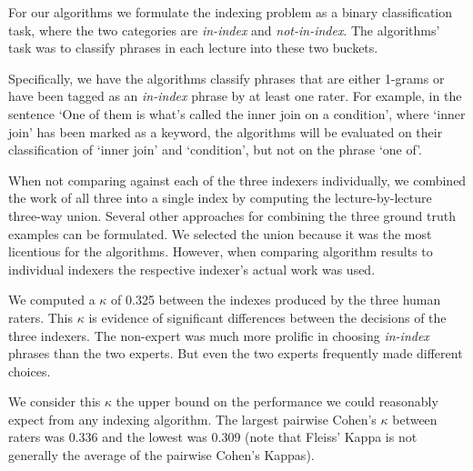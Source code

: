 For our algorithms we formulate the indexing problem as a binary
classification task, where the two categories are {\em in-index} and
{\em not-in-index}. The algorithms' task was to classify phrases in
each lecture into these two buckets.

Specifically, we have the algorithms classify phrases that are either
1-grams or have been tagged as an {\em in-index} phrase by at least one
rater. For example, in the sentence `One of them is what's called
the inner join on a condition', where `inner join' has been marked as
a keyword, the algorithms will be evaluated on their classification
of `inner join' and `condition', but not on the phrase `one of'.

When not comparing against each of the three indexers individually, we
combined the work of all three into a single index by computing the
lecture-by-lecture three-way union. Several other approaches for
combining the three ground truth examples can be formulated. We
selected the union because it was the most licentious for the
algorithms. However, when comparing algorithm results to individual
indexers the respective indexer's actual work was used.

We computed a $\kappa$ of 0.325 between the indexes produced by the
three human raters. This $\kappa$ is evidence of significant
differences between the decisions of the three indexers. The
non-expert was much more prolific in choosing {\em in-index} phrases
than the two experts. But even the two experts frequently made
different choices.

We consider this $\kappa$ the upper bound on the performance we could
reasonably expect from any indexing algorithm. The largest pairwise
Cohen's $\kappa$ between raters was 0.336 and the lowest was 0.309
(note that Fleiss' Kappa is not generally the average of the pairwise
Cohen's Kappas).

